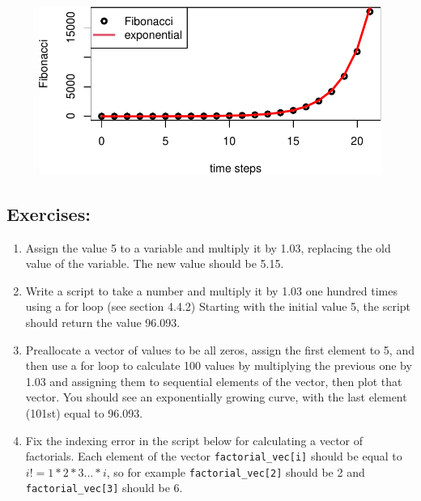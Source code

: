 \documentclass[
  letterpaper,
  DIV=11,
  numbers=noendperiod]{scrreprt}
\begin{document}
\begin{figure}[H]

{\centering \includegraphics{./lindiff_files/figure-pdf/unnamed-chunk-8-1.pdf}

}

\end{figure}

\hypertarget{exercises-19}{%
\subsection{Exercises:}\label{exercises-19}}

\begin{enumerate}
\def\labelenumi{\arabic{enumi}.}
\item
  Assign the value 5 to a variable and multiply it by 1.03, replacing
  the old value of the variable. The new value should be 5.15.
\item
  Write a script to take a number and multiply it by 1.03 one hundred
  times using a for loop (see section 4.4.2) Starting with the initial
  value 5, the script should return the value 96.093.
\item
  Preallocate a vector of values to be all zeros, assign the first
  element to 5, and then use a for loop to calculate 100 values by
  multiplying the previous one by 1.03 and assigning them to sequential
  elements of the vector, then plot that vector. You should see an
  exponentially growing curve, with the last element (101st) equal to
  96.093.
\item
  Fix the indexing error in the script below for calculating a vector of
  factorials. Each element of the vector \texttt{factorial\_vec{[}i{]}}
  should be equal to \(i!= 1*2*3...*i\), so for example
  \texttt{factorial\_vec{[}2{]}} should be 2 and
  \texttt{factorial\_vec{[}3{]}} should be 6.
\end{enumerate}
\end{document}
